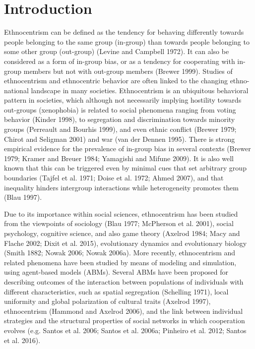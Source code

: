 \section{Introduction}
\label{intro}
Ethnocentrism can be defined as the tendency for behaving differently towards people belonging to the same group (in-group) than towards people belonging to some other group (out-group) (Levine and Campbell 1972). It can also be considered as a form of in-group bias, or as a tendency for cooperating with in-group members but not with out-group members (Brewer 1999). Studies of ethnocentrism and ethnocentric behavior are often linked to the changing ethno-national landscape in many societies. Ethnocentrism is an ubiquitous behavioral pattern in societies, which although not necessarily implying hostility towards out-groups (xenophobia) is related to social phenomena ranging from voting behavior (Kinder 1998), to segregation and discrimination towards minority groups (Perreault and Bourhis 1999), and even ethnic conflict (Brewer 1979; Chirot and Seligman 2001) and war (van der Dennen 1995). There is strong empirical evidence for the prevalence of in-group bias in several contexts (Brewer 1979; Kramer and Breuer 1984; Yamagishi and Mifune 2009). It is also well known that this can be triggered even by minimal cues that set arbitrary group boundaries (Tajfel et al. 1971; Doise et al. 1972; Ahmed 2007), and that inequality hinders intergroup interactions while heterogeneity promotes them (Blau 1997). 


Due to its importance within social sciences, ethnocentrism has been studied from the viewpoints of sociology (Blau 1977; McPherson et al. 2001), social psychology, cognitive science, and also game theory (Axelrod 1984; Macy and Flache 2002; Dixit et al. 2015), evolutionary dynamics and evolutionary biology (Smith 1882; Nowak 2006; Nowak 2006a). More recently, ethnocentrism and related phenomena have been studied by means of modeling and simulation, using agent-based models (ABMs). Several ABMs have been proposed for describing outcomes of the interaction between populations of individuals with different characteristics, such as spatial segregation (Schelling 1971), local uniformity and global polarization of cultural traits (Axelrod 1997), ethnocentrism (Hammond and Axelrod 2006), and the link between individual strategies and the structural properties of social networks in which cooperation evolves (e.g. Santos et al. 2006; Santos et al. 2006a; Pinheiro et al. 2012; Santos et al. 2016). 

